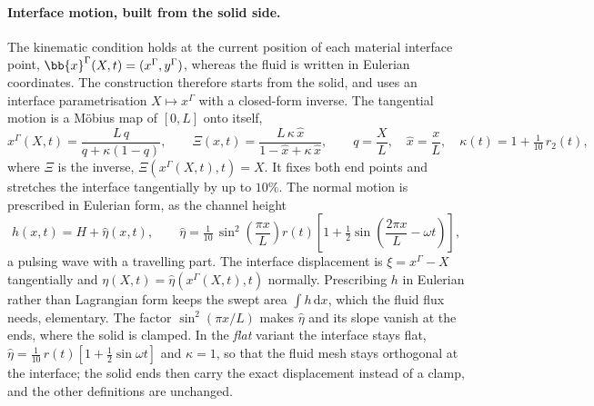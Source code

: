 \paragraph{Interface motion, built from the solid side.}
The kinematic condition holds at the current position of each material interface point, $\bb{x}^\Gamma(X,t) = (x^\Gamma, y^\Gamma)$, whereas the fluid is written in Eulerian coordinates.
The construction therefore starts from the solid, and uses an interface parametrisation $X \mapsto x^\Gamma$ with a closed-form inverse.
The tangential motion is a M\"obius map of $[0,L]$ onto itself,
\begin{equation}
  x^\Gamma(X,t) = \frac{L\,q}{q + \kappa(1-q)}, \qquad
  \Xi(x,t) = \frac{L\,\kappa\,\hat{x}}{1 - \hat{x} + \kappa\,\hat{x}}, \qquad
  q = \frac{X}{L}, \quad \hat{x} = \frac{x}{L}, \quad \kappa(t) = 1 + \tfrac{1}{10}\,r_2(t),
  \label{eq:mmsc_mobius}
\end{equation}
where $\Xi$ is the inverse, $\Xi(x^\Gamma(X,t),t) = X$.
It fixes both end points and stretches the interface tangentially by up to $10\%$.
The normal motion is prescribed in Eulerian form, as the channel height
\begin{equation}
  h(x,t) = H + \hat\eta(x,t), \qquad
  \hat\eta = \tfrac{1}{10}\,\sin^2\!\left(\frac{\pi x}{L}\right) r(t)\left[1 + \tfrac{1}{2}\sin\!\left(\frac{2\pi x}{L} - \omega t\right)\right],
  \label{eq:mmsc_h}
\end{equation}
a pulsing wave with a travelling part.
The interface displacement is $\xi = x^\Gamma - X$ tangentially and $\eta(X,t) = \hat\eta(x^\Gamma(X,t),t)$ normally.
Prescribing $h$ in Eulerian rather than Lagrangian form keeps the swept area $\int h\,\mathrm{d}x$, which the fluid flux needs, elementary.
The factor $\sin^2(\pi x/L)$ makes $\hat\eta$ and its slope vanish at the ends, where the solid is clamped.
In the \emph{flat} variant the interface stays flat, $\hat\eta = \tfrac{1}{10}\,r(t)\left[1 + \tfrac12\sin\omega t\right]$ and $\kappa = 1$, so that the fluid mesh stays orthogonal at the interface; the solid ends then carry the exact displacement instead of a clamp, and the other definitions are unchanged.

